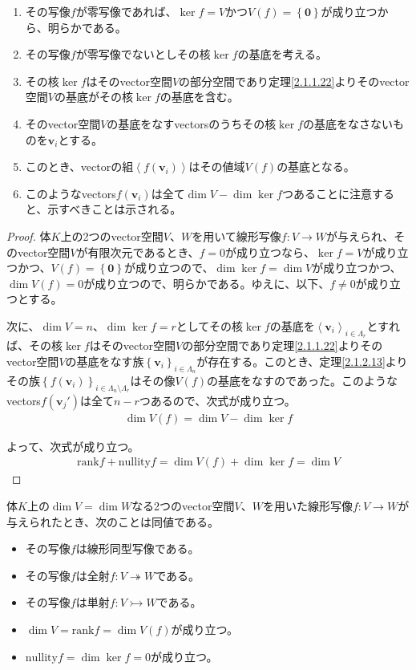\documentclass[dvipdfmx]{jsarticle}
\begin{document}
\begin{enumerate}
\item
  その写像$f$が零写像であれば、$\ker f = V$かつ$V(f) = \left\{ \mathbf{0} \right\}$が成り立つから、明らかである。
\item
  その写像$f$が零写像でないとしその核$\ker f$の基底を考える。
\item
  その核$\ker f$はそのvector空間$V$の部分空間であり定理\ref{2.1.1.22}よりそのvector空間$V$の基底がその核$\ker f$の基底を含む。
\item
  そのvector空間$V$の基底をなすvectorsのうちその核$\ker f$の基底をなさないものを$\mathbf{v}_{i}$とする。
\item
  このとき、vectorの組$\left\langle f\left( \mathbf{v}_{i} \right) \right\rangle$はその値域$V(f)$の基底となる。
\item
  このようなvectors$f\left( \mathbf{v}_{i} \right)$は全て$\dim V - \dim{\ker f}$つあることに注意すると、示すべきことは示される。
\end{enumerate}
\begin{proof}
体$K$上の2つのvector空間$V$、$W$を用いて線形写像$f:V \rightarrow W$が与えられ、そのvector空間$V$が有限次元であるとき、$f = 0$が成り立つなら、$\ker f = V$が成り立つかつ、$V(f) = \left\{ \mathbf{0} \right\}$が成り立つので、$\dim{\ker f} = \dim V$が成り立つかつ、$\dim{V(f)} = 0$が成り立つので、明らかである。ゆえに、以下、$f \neq 0$が成り立つとする。\par
次に、$\dim V = n$、$\dim{\ker f} = r$としてその核$\ker f$の基底を$\left\langle \mathbf{v}_{i} \right\rangle_{i \in \varLambda_{r}}$とすれば、その核$\ker f$はそのvector空間$V$の部分空間であり定理\ref{2.1.1.22}よりそのvector空間$V$の基底をなす族$\left\{ \mathbf{v}_i \right\}_{i \in \varLambda_{n} } $が存在する。このとき、定理\ref{2.1.2.13}よりその族$\left\{ f\left( \mathbf{v}_i \right) \right\}_{i \in \varLambda_{n} \setminus \varLambda_{r} } $はその像$V(f)$の基底をなすのであった。このようなvectors$f\left( \mathbf{v}_{j}' \right)$は全て$n - r$つあるので、次式が成り立つ。
\begin{align*}
\dim{V(f)} = \dim V - \dim{\ker f}
\end{align*}\par
よって、次式が成り立つ。
\begin{align*}
{\mathrm{rank}}f + {\mathrm{nullity}}f = \dim{V(f)} + \dim{\ker f} = \dim V
\end{align*}
\end{proof}
\begin{thm}\label{2.1.2.15}
体$K$上の$\dim V = \dim W$なる2つのvector空間$V$、$W$を用いた線形写像$f:V \rightarrow W$が与えられたとき、次のことは同値である。
\begin{itemize}
\item
  その写像$f$は線形同型写像である。
\item
  その写像$f$は全射$f:V \twoheadrightarrow W$である。
\item
  その写像$f$は単射$f:V \rightarrowtail W$である。
\item
  $\dim V = {\mathrm{rank}}f = \dim{V(f)}$が成り立つ。
\item
  ${\mathrm{nullity}}f = \dim{\ker f} = 0$が成り立つ。
\end{itemize}
\end{thm}\par
\end{document}
